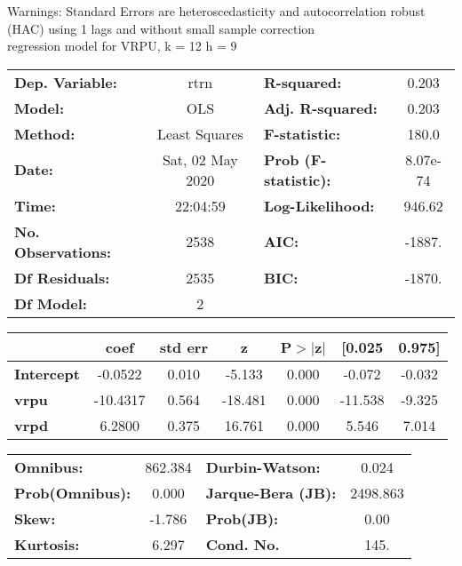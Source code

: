 Warnings: \newline
 [1] Standard Errors are heteroscedasticity and autocorrelation robust (HAC) using 1 lags and without small sample correction\\ 

regression model for VRPU, k = 12 h = 9\begin{center}
\begin{tabular}{lclc}
\toprule
\textbf{Dep. Variable:}    &       rtrn       & \textbf{  R-squared:         } &     0.203   \\
\textbf{Model:}            &       OLS        & \textbf{  Adj. R-squared:    } &     0.203   \\
\textbf{Method:}           &  Least Squares   & \textbf{  F-statistic:       } &     180.0   \\
\textbf{Date:}             & Sat, 02 May 2020 & \textbf{  Prob (F-statistic):} &  8.07e-74   \\
\textbf{Time:}             &     22:04:59     & \textbf{  Log-Likelihood:    } &    946.62   \\
\textbf{No. Observations:} &        2538      & \textbf{  AIC:               } &    -1887.   \\
\textbf{Df Residuals:}     &        2535      & \textbf{  BIC:               } &    -1870.   \\
\textbf{Df Model:}         &           2      & \textbf{                     } &             \\
\bottomrule
\end{tabular}
\begin{tabular}{lcccccc}
                   & \textbf{coef} & \textbf{std err} & \textbf{z} & \textbf{P$> |$z$|$} & \textbf{[0.025} & \textbf{0.975]}  \\
\midrule
\textbf{Intercept} &      -0.0522  &        0.010     &    -5.133  &         0.000        &       -0.072    &       -0.032     \\
\textbf{vrpu}      &     -10.4317  &        0.564     &   -18.481  &         0.000        &      -11.538    &       -9.325     \\
\textbf{vrpd}      &       6.2800  &        0.375     &    16.761  &         0.000        &        5.546    &        7.014     \\
\bottomrule
\end{tabular}
\begin{tabular}{lclc}
\textbf{Omnibus:}       & 862.384 & \textbf{  Durbin-Watson:     } &    0.024  \\
\textbf{Prob(Omnibus):} &   0.000 & \textbf{  Jarque-Bera (JB):  } & 2498.863  \\
\textbf{Skew:}          &  -1.786 & \textbf{  Prob(JB):          } &     0.00  \\
\textbf{Kurtosis:}      &   6.297 & \textbf{  Cond. No.          } &     145.  \\
\bottomrule
\end{tabular}
\end{center}

